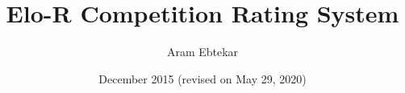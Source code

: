 \documentclass[sigconf, anonymous, review]{acmart}
\title{Elo-R Competition Rating System}
\author{Aram Ebtekar}
\date{December 2015 (revised on May 29, 2020)}
\begin{document}


\maketitle







\pagebreak





%



\end{document}
